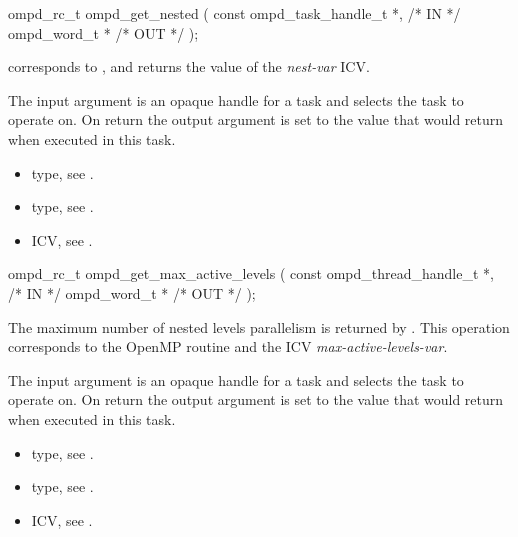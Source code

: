 \summary

\format
\cspecificstart
\begin{boxedcode}
ompd\_rc\_t ompd\_get\_nested (
  const ompd\_task\_handle\_t  *,                           /* IN */
  ompd\_word\_t              *                                   /* OUT */
);
\end{boxedcode}
\cspecificend

\descr
{} corresponds to ,
and returns the value of the \emph{nest-var} ICV.

\argdesc
The input argument  is an opaque handle for a task and selects the task to operate on.
On return the output argument  is set to the value that  would return when
executed in this task.

\crossreferences
\begin{itemize}
	\item {} type, see .
	\item {} type, see .
	\item {} ICV, see .
\end{itemize}


\summary

\format
\cspecificstart
\begin{boxedcode}
ompd\_rc\_t ompd\_get\_max\_active\_levels (
  const ompd\_thread\_handle\_t  *,                       /* IN */
  ompd\_word\_t                *                                 /* OUT */
);
\end{boxedcode}
\cspecificend

\descr
The maximum number of nested levels parallelism is returned by
.
This operation corresponds to the OpenMP routine
and the ICV \emph{max-active-levels-var}.%

\argdesc
The input argument  is an opaque handle for a task and selects the task to operate on.
On return the output argument  is set to the value that  would return when
executed in this task.

\crossreferences
\begin{itemize}
	\item {} type, see .
	\item {} type, see .
	\item {} ICV, see .
\end{itemize}


